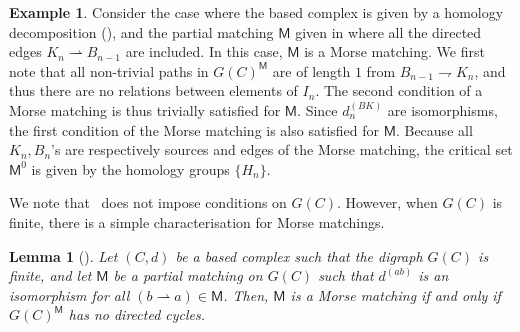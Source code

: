 \documentclass[11pt, table, nothms]{amsart}
\newtheorem{lemma}[theorem]{Lemma}
\theoremstyle{definition}
\newtheorem{example}[theorem]{Example}
\newcommand{\sM}{\mathsf{M}}
\begin{document}
{\begin{example} \label{ex:homology_decomposition_based_3}
    Consider the case where the based complex is given by a homology decomposition (), and the partial matching $\sM$ given in  where all the directed edges $K_n \rightharpoonup B_{n-1}$ are included. In this case, $\sM$ is a Morse matching. We first note that all non-trivial paths in $G(C)^\sM$ are of length $1$ from $B_{n-1} \rightharpoondown K_n$, and thus there are no relations between elements of $I_n$. The second condition of a Morse matching is thus trivially satisfied for $\sM$. Since $d_n^{(BK)}$ are isomorphisms, the first condition of the Morse matching is also satisfied for $\sM$.  Because all $K_n,B_n$'s are respectively sources and edges of the Morse matching, the critical set $\sM^0$ is given by the homology groups $\{H_n\}$. 
\end{example}
We note that~ does not impose conditions on $G(C)$. 
However, when $G(C)$ is finite, there is a simple characterisation for Morse matchings.
\begin{lemma}[{\cite[Lemma 1]
{Skoldberg2006MorseViewpoint}}]\label{lemma:morse-cycles-matching}
    Let $(C, d)$ be a based complex such that the digraph $G(C)$ is finite, and let $\sM$ be a partial matching on $G(C)$ such that $d^{(ab)}$ is an isomorphism for all 
    $(b \rightharpoonup a)\in \sM$. 
    Then, $\sM$ is a \emph{Morse matching} if and only if $G(C)^\sM$ has no directed cycles.
\end{lemma}

}
\end{document}
